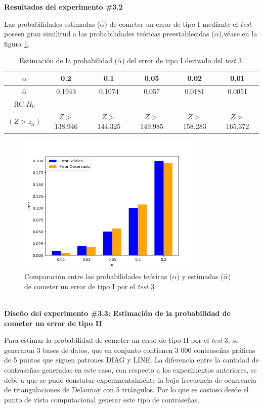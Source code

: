 \documentclass[12pt]{report}
\begin{document}
\textbf{Resultados del experimento \#3.2}

Las probabilidades estimadas ($\hat{\alpha}$) de cometer un error de tipo I  mediante el \textit{test} poseen gran similitud  a las probabilidades teóricas preestablecidas ($\alpha$),véase en la figura \ref{Teorico vs Observado3}.
\begin{table}[h!]
	\centering
		\caption{Estimación de la probabilidad ($\hat{\alpha}$) del error de tipo I derivado del \textit{test} 3.}
	\begin{tabular}{|c|ccccc|}
		\hline
		$\alpha$ & 0.2 &   0.1 &  0.05 &  0.02 &  0.01 \\
		\hline
		$\hat{\alpha}$ & 0.1943 & 0.1074 & 0.057 & 0.0181 & 0.0051 \\
		\hline
	RC $H_0$ 		&		&		&		&		&\\
		$(Z>z_\alpha)$&  $Z>$138.946& $Z>$144.325& $Z>$149.985& $Z>$158.283& $Z>$165.372\\	
		\hline
	\end{tabular}

	\label{tab3:error1-prob1}
\end{table}
\begin{figure}[ht]
	\centering
	
	\includegraphics[width=0.8\textwidth]{5td_teo_obs.png}
	\caption{Comparación entre las probabilidades teóricas ($\alpha$) y estimadas ($\hat{\alpha}$) de cometer un error de tipo I por el \textit{test} 3. }
	\label{Teorico vs Observado3}
\end{figure}\\
\newpage
\textbf{Diseño del experimento \#3.3: Estimación de la probabilidad de cometer un error de tipo II}

Para estimar la probabilidad de cometer un error de tipo II por el \textit{test} 3, se generaron 3 bases de datos, que en conjunto contienen 3 000 contraseñas gráficas de 5 puntos que siguen patrones DIAG y LINE. La diferencia entre la cantidad de contraseñas generadas en este caso, con respecto a los experimentos anteriores, se debe a que se pudo constatar experimentalmente la baja frecuencia de ocurrencia de triangulaciones de Delaunay con 5 triángulos. Por lo que es costoso desde el punto de vista computacional generar este tipo de contraseñas.
\end{document}
